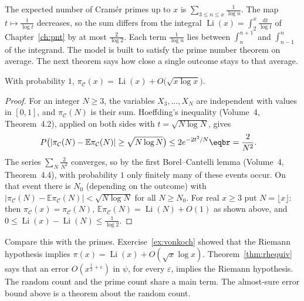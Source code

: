 The expected number of Cramér primes up to $x$ is $\sum_{3\le n\le x}\frac1{\log n}$. The map $t\mapsto\frac1{\log t}$ decreases, so the sum differs from the integral $\operatorname{Li}(x)=\int_2^x\frac{\mathrm dt}{\log t}$ of Chapter~\ref{ch:pnt} by at most $\frac2{\log2}$. Each term $\frac1{\log n}$ lies between $\int_n^{n+1}$ and $\int_{n-1}^n$ of the integrand. The model is built to satisfy the prime number theorem on average. The next theorem says how close a single outcome stays to that average.

\begin{theorem}[Cramér]\label{thm:cramerpnt}
With probability $1$, $\pi_{\mathcal C}(x)=\operatorname{Li}(x)+O\bigl(\sqrt{x\log x}\bigr)$.
\end{theorem}

\begin{proof}
For an integer $N\ge3$, the variables $X_3,\dots,X_N$ are independent with values in $[0,1]$, and $\pi_{\mathcal C}(N)$ is their sum. Hoeffding's inequality (Volume~4, Theorem~4.2), applied on both sides with
$t=\sqrt{N\log N}$, gives
\[
\begin{aligned}P\bigl(|\pi_{\mathcal C}(N)-\mathbb E\pi_{\mathcal C}(N)|\ge\sqrt{N\log N}\bigr)&\le2e^{-2t^2/N}\eqbr=\frac2{N^2}.\end{aligned}
\]
The series $\sum_N\frac2{N^2}$ converges, so by the first Borel--Cantelli lemma (Volume~4, Theorem~4.4), with probability $1$ only finitely many of these events occur. On that event there is
$N_0$ (depending on the outcome) with $|\pi_{\mathcal C}(N)-\mathbb E\pi_{\mathcal C}(N)|<\sqrt{N\log N}$ for all $N\ge N_0$. For real $x\ge3$ put $N=\lfloor x\rfloor$: then $\pi_{\mathcal C}(x)=\pi_{\mathcal C}(N)$,
$\mathbb E\pi_{\mathcal C}(N)=\operatorname{Li}(N)+O(1)$ as shown above, and $0\le\operatorname{Li}(x)-\operatorname{Li}(N)\le\frac1{\log2}$.
\end{proof}

Compare this with the primes. Exercise~\ref{ex:vonkoch} showed that the Riemann hypothesis implies $\pi(x)=\operatorname{Li}(x)+O(\sqrt x\log x)$. Theorem~\ref{thm:rhequiv} says that an error $O(x^{\frac12+\varepsilon})$ in $\psi$, for every $\varepsilon$, implies the Riemann hypothesis. The random count and the prime count share a main term. The almost-sure error bound above is a theorem about the random count.

